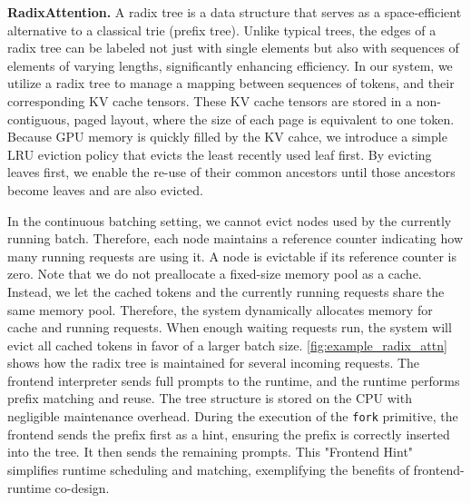 \textbf{RadixAttention.}
A radix tree is a data structure that serves as a space-efficient alternative to a classical trie (prefix tree). Unlike typical trees, the edges of a radix tree can be labeled not just with single elements but also with sequences of elements of varying lengths, significantly enhancing efficiency.
In our system, we utilize a radix tree to manage a mapping between sequences of tokens, and their corresponding KV cache tensors. These KV cache tensors are stored in a non-contiguous, paged layout, where the size of each page is equivalent to one token.
Because GPU memory is quickly filled by the KV cahce, we introduce a simple LRU eviction policy that evicts the least recently used leaf first.  By evicting leaves first, we enable the re-use of their common ancestors until those ancestors become leaves and are also evicted.

In the continuous batching setting, we cannot evict nodes used by the currently running batch. Therefore, each node maintains a reference counter indicating how many running requests are using it. A node is evictable if its reference counter is zero. Note that we do not preallocate a fixed-size memory pool as a cache. Instead, we let the cached tokens and the currently running requests share the same memory pool. Therefore, the system dynamically allocates memory for cache and running requests. When enough waiting requests run, the system will evict all cached tokens in favor of a larger batch size.
\autoref{fig:example_radix_attn} shows how the radix tree is maintained for several incoming requests. 
The frontend interpreter sends full prompts to the runtime, and the runtime performs prefix matching and reuse. 
The tree structure is stored on the CPU with negligible maintenance overhead. 
During the execution of the \texttt{fork} primitive, the frontend sends the prefix first as a hint, ensuring the prefix is correctly inserted into the tree. It then sends the remaining prompts. This "Frontend Hint" simplifies runtime scheduling and matching, exemplifying the benefits of frontend-runtime co-design.


